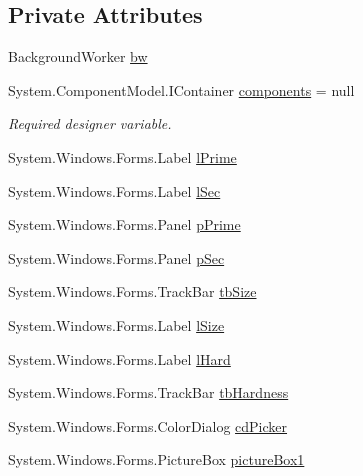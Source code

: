 \subsection*{Private Attributes}
\begin{DoxyCompactItemize}
\item 
Background\+Worker \mbox{\hyperlink{class_paint___program_1_1_brush_settings_a4a6c7587cfe067c706a8a4bf6dad9687}{bw}}
\item 
System.\+Component\+Model.\+I\+Container \mbox{\hyperlink{class_paint___program_1_1_brush_settings_ac77b6db502083ba592247e0eb007b752}{components}} = null
\begin{DoxyCompactList}\small\item\em Required designer variable. \end{DoxyCompactList}\item 
System.\+Windows.\+Forms.\+Label \mbox{\hyperlink{class_paint___program_1_1_brush_settings_ad1374b70dcfd1117d237d46167098107}{l\+Prime}}
\item 
System.\+Windows.\+Forms.\+Label \mbox{\hyperlink{class_paint___program_1_1_brush_settings_a60325fa004c05787a228d967d573f4d8}{l\+Sec}}
\item 
System.\+Windows.\+Forms.\+Panel \mbox{\hyperlink{class_paint___program_1_1_brush_settings_aa26b8d7e9bd76be17ad0af0dfae26b88}{p\+Prime}}
\item 
System.\+Windows.\+Forms.\+Panel \mbox{\hyperlink{class_paint___program_1_1_brush_settings_ae307f3b6b6590fccaa8312c6640ef307}{p\+Sec}}
\item 
System.\+Windows.\+Forms.\+Track\+Bar \mbox{\hyperlink{class_paint___program_1_1_brush_settings_aab6f4a0f6015a47c64a140d940730766}{tb\+Size}}
\item 
System.\+Windows.\+Forms.\+Label \mbox{\hyperlink{class_paint___program_1_1_brush_settings_a9a046fcd4dcc4a3947164cd28b1db6cd}{l\+Size}}
\item 
System.\+Windows.\+Forms.\+Label \mbox{\hyperlink{class_paint___program_1_1_brush_settings_a6188606b564d51909bb795f534259f5c}{l\+Hard}}
\item 
System.\+Windows.\+Forms.\+Track\+Bar \mbox{\hyperlink{class_paint___program_1_1_brush_settings_a77762235bb3accadb1cbd086a37847c0}{tb\+Hardness}}
\item 
System.\+Windows.\+Forms.\+Color\+Dialog \mbox{\hyperlink{class_paint___program_1_1_brush_settings_acfe4bdbac1c6a99a434ff8d8fe91aadb}{cd\+Picker}}
\item 
System.\+Windows.\+Forms.\+Picture\+Box \mbox{\hyperlink{class_paint___program_1_1_brush_settings_a21f90465fb5e4e5ae932019b57142815}{picture\+Box1}}
\end{DoxyCompactItemize}


